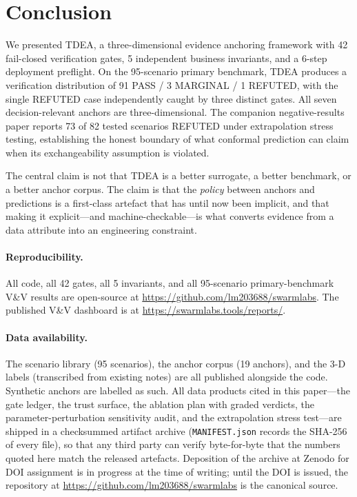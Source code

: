 \documentclass[review,3p]{elsarticle}
\begin{document}
\section{Conclusion}
\label{sec:conclusion}

We presented TDEA, a three-dimensional evidence anchoring framework with 42 fail-closed verification gates, 5 independent business invariants, and a 6-step deployment preflight. On the 95-scenario primary benchmark, TDEA produces a verification distribution of 91 PASS / 3 MARGINAL / 1 REFUTED, with the single REFUTED case independently caught by three distinct gates. All seven decision-relevant anchors are three-dimensional. The companion negative-results paper reports 73 of 82 tested scenarios REFUTED under extrapolation stress testing, establishing the honest boundary of what conformal prediction can claim when its exchangeability assumption is violated.

The central claim is not that TDEA is a better surrogate, a better benchmark, or a better anchor corpus. The claim is that the \emph{policy} between anchors and predictions is a first-class artefact that has until now been implicit, and that making it explicit---and machine-checkable---is what converts evidence from a data attribute into an engineering constraint.

\paragraph{Reproducibility.}
All code, all 42 gates, all 5 invariants, and all 95-scenario primary-benchmark V\&V results are open-source at \url{https://github.com/lm203688/swarmlabs}. The published V\&V dashboard is at \url{https://swarmlabs.tools/reports/}.

\paragraph{Data availability.}
The scenario library (95 scenarios), the anchor corpus (19 anchors), and the 3-D labels (transcribed from existing notes) are all published alongside the code. Synthetic anchors are labelled as such. All data products cited in this paper---the gate ledger, the trust surface, the ablation plan with graded verdicts, the parameter-perturbation sensitivity audit, and the extrapolation stress test---are shipped in a checksummed artifact archive (\texttt{MANIFEST.json} records the SHA-256 of every file), so that any third party can verify byte-for-byte that the numbers quoted here match the released artefacts. Deposition of the archive at Zenodo for DOI assignment is in progress at the time of writing; until the DOI is issued, the repository at \url{https://github.com/lm203688/swarmlabs} is the canonical source.
\end{document}
